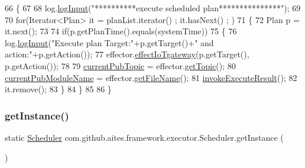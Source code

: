 \begin{DoxyCode}
66                                           \{
67 
68         log.\mbox{\hyperlink{classcom_1_1github_1_1aites_1_1framework_1_1log_1_1_log_writter_ad2c412c85ba5932c7fa4f920c50f44c9}{logInput}}(\textcolor{stringliteral}{"**********execute scheduled plan***************"});
69         
70         \textcolor{keywordflow}{for}(Iterator<Plan> it = planList.iterator() ; it.hasNext() ; )
71         \{
72             Plan p  = it.next();
73             
74             \textcolor{keywordflow}{if}(p.getPlanTime().equals(systemTime))
75             \{
76                 log.\mbox{\hyperlink{classcom_1_1github_1_1aites_1_1framework_1_1log_1_1_log_writter_ad2c412c85ba5932c7fa4f920c50f44c9}{logInput}}(\textcolor{stringliteral}{"Execute plan Target:"}+p.getTarget()+\textcolor{stringliteral}{" and action:"}+p.getAction());
77                 effector.\mbox{\hyperlink{classcom_1_1github_1_1aites_1_1framework_1_1executor_1_1_effector_a2d1c773b1c83789a3ffb01cd32bfb276}{effectIoTgateway}}(p.getTarget(), p.getAction());
78                 
79                 \mbox{\hyperlink{classcom_1_1github_1_1aites_1_1framework_1_1executor_1_1_scheduler_ae69931a45d8afef7275c3ba88bb59271}{currentPubTopic}} = effector.\mbox{\hyperlink{classcom_1_1github_1_1aites_1_1framework_1_1executor_1_1_effector_a32701bc6b0551ff24afdb6a23f759647}{getTopic}}();
80                 \mbox{\hyperlink{classcom_1_1github_1_1aites_1_1framework_1_1executor_1_1_scheduler_a036d601d648148fb655d33fba188306d}{currentPubModuleName}} = effector.\mbox{\hyperlink{classcom_1_1github_1_1aites_1_1framework_1_1executor_1_1_effector_adc2b5fde4f917d55b836591376a75e86}{getFileName}}();
81                 \mbox{\hyperlink{classcom_1_1github_1_1aites_1_1framework_1_1executor_1_1_scheduler_a5b6abd860608f6c3dd021aed7d85bfc6}{invokeExecuteResult}}();
82                 it.remove();
83             \}
84         \}
85 
86     \}\end{DoxyCode}
\mbox{\label{classcom_1_1github_1_1aites_1_1framework_1_1executor_1_1_scheduler_af136f59f2b8a958f6ba76cf74068e52b}} 
\subsubsection{\texorpdfstring{get\+Instance()}{getInstance()}}
{\footnotesize\ttfamily static \mbox{\hyperlink{classcom_1_1github_1_1aites_1_1framework_1_1executor_1_1_scheduler}{Scheduler}} com.\+github.\+aites.\+framework.\+executor.\+Scheduler.\+get\+Instance (\begin{DoxyParamCaption}{ }\end{DoxyParamCaption})\hspace{0.3cm}{\ttfamily [static]}}



